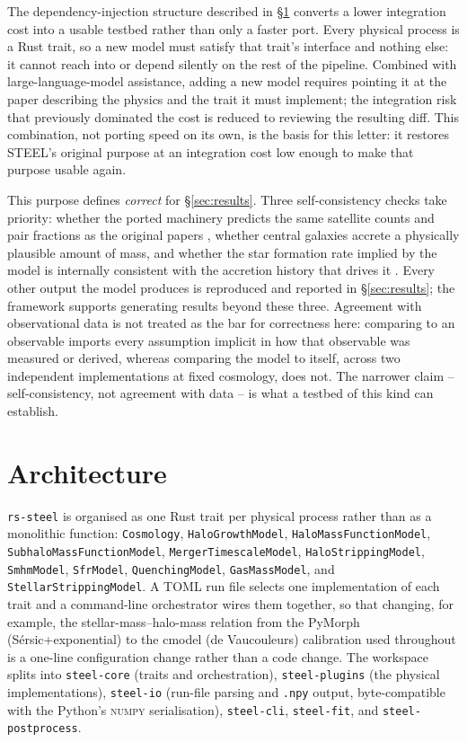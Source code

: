 \documentclass[fleqn,usenatbib]{mnras}
\begin{document}
The dependency-injection structure described in \S\ref{sec:port}
converts a lower integration cost into a usable testbed rather than
only a faster port. Every physical process is a Rust trait, so a new
model must satisfy that trait's interface and nothing else: it cannot
reach into or depend silently on the rest of the pipeline. Combined
with large-language-model assistance, adding a new model requires
pointing it at the paper describing the physics and the trait it must
implement; the integration risk that previously dominated the cost is
reduced to reviewing the resulting diff. This combination, not porting
speed on its own, is the basis for this letter: it restores STEEL's
original purpose at an integration cost low enough to make that purpose
usable again.

This purpose defines \emph{correct} for \S\ref{sec:results}. Three
self-consistency checks take priority: whether the ported machinery
predicts the same satellite counts and pair fractions as the original
papers \citep{Grylls2019a,Grylls2020b}, whether central galaxies accrete
a physically plausible amount of mass, and whether the star formation
rate implied by the model is internally consistent with the accretion
history that drives it \citep{Grylls2020}. Every other output the model
produces is reproduced and reported in \S\ref{sec:results}; the
framework supports generating results beyond these three. Agreement
with observational data is not treated as the bar for correctness here:
comparing to an observable imports every assumption implicit in how
that observable was measured or derived, whereas comparing the model to
itself, across two independent implementations at fixed cosmology, does
not. The narrower claim -- self-consistency, not agreement with data --
is what a testbed of this kind can establish.


\section{Architecture}
\label{sec:port}

\texttt{rs-steel} is organised as one Rust trait per physical process
rather than as a monolithic function: \texttt{Cosmology},
\texttt{HaloGrowthModel}, \texttt{HaloMassFunctionModel},
\texttt{SubhaloMassFunctionModel}, \texttt{MergerTimescaleModel},
\texttt{HaloStrippingModel}, \texttt{SmhmModel}, \texttt{SfrModel},
\texttt{QuenchingModel}, \texttt{GasMassModel}, and
\texttt{StellarStrippingModel}. A TOML run file selects one
implementation of each trait and a command-line orchestrator wires them
together, so that changing, for example, the stellar-mass--halo-mass
relation from the PyMorph (S\'ersic+exponential) to the cmodel (de
Vaucouleurs) calibration used throughout \citet{Grylls2020} is a one-line
configuration change rather than a code change. The workspace splits
into \texttt{steel-core} (traits and orchestration), \texttt{steel-plugins}
(the physical implementations), \texttt{steel-io} (run-file parsing and
\texttt{.npy} output, byte-compatible with the Python's \textsc{numpy}
serialisation), \texttt{steel-cli}, \texttt{steel-fit}, and
\texttt{steel-postprocess}.
\end{document}
